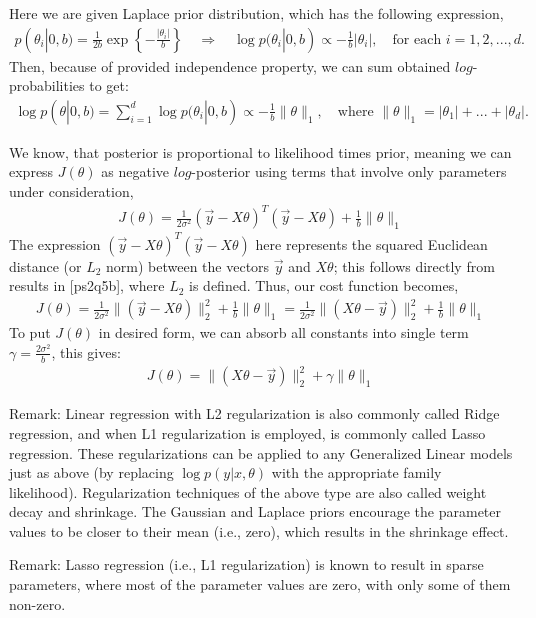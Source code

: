 \documentclass{article}
\begin{document}
\begin{enumerate}
Here we are given Laplace prior distribution, which has the following expression,
\begin{align*}
p(\theta_i|0,b) = \frac{1}{2b}\exp\left\{-\frac{|\theta_i|}{b}\right\}\quad\Rightarrow\quad \log p(\theta_i|0,b) \propto -\frac{1}{b}|\theta_i|, \quad\mbox{for each } i = 1, 2, ..., d.
\end{align*}
Then, because of provided independence property, we can sum obtained $log$-probabilities to get:
\begin{align*}
\log p(\theta|0,b) = \sum_{i=1}^{d} \log p(\theta_i|0,b) \propto -\frac{1}{b}\|\theta\|_{1}, \quad\mbox{where } \|\theta\|_{1} = |\theta_1| + ... + |\theta_d|.
\end{align*}

We know, that posterior is proportional to likelihood times prior, meaning we can express $J(\theta)$ as negative $log$-posterior using terms that involve only parameters under consideration, 
\begin{align*}
    J(\theta) = \frac{1}{2\sigma^2}(\vec{y} - X\theta)^T(\vec{y} - X\theta) + \frac{1}{b}\|\theta\|_{1}
\end{align*}
The expression $(\vec{y} - X\theta)^T(\vec{y} - X\theta)$ here represents the squared Euclidean distance (or $L_2$ norm) between the vectors $\vec{y}$ and $X\theta$; this follows directly from results in [ps2q5b], where $L_2$ is defined. Thus, our cost function becomes,
\begin{align*}
    J(\theta) = \frac{1}{2\sigma^2}\|(\vec{y} - X\theta)\|_2^2 + \frac{1}{b}\|\theta\|_{1} = \frac{1}{2\sigma^2}\|(X\theta - \vec{y})\|_2^2 + \frac{1}{b}\|\theta\|_{1}
\end{align*}
To put $J(\theta)$ in desired form, we can absorb all constants into single term $\gamma = \frac{2\sigma^2}{b}$, this gives:
\begin{align*}
    \boxed{J(\theta) = \|(X\theta - \vec{y})\|_2^2 + \gamma\|\theta\|_{1}}
\end{align*}


\end{enumerate}

Remark: Linear regression with L2 regularization is also commonly called Ridge regression, and when L1 regularization is employed, is commonly called Lasso regression. These regularizations can be applied to any Generalized Linear models just as above (by replacing $\log p(y|x,\theta)$ with the appropriate family likelihood). Regularization techniques of the above type are also called weight decay and shrinkage. The Gaussian and Laplace priors encourage the parameter values to be closer to their mean (i.e., zero), which results in the shrinkage effect.

Remark: Lasso regression (i.e., L1 regularization) is known to result in sparse parameters, where most of the parameter values are zero, with only some of them non-zero.
\end{document}
